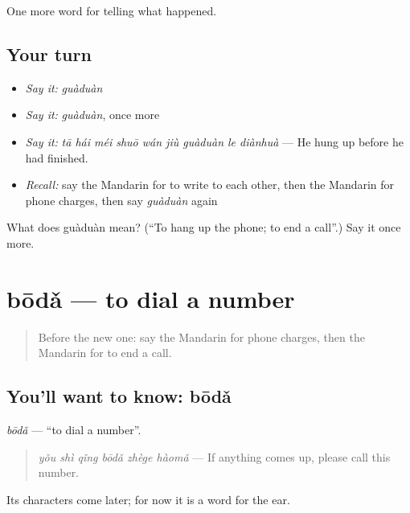 \begin{grammarlens}[title={What you've built}]
One more word for telling what happened.
\end{grammarlens}

\subsection*{Your turn}
\begin{itemize}
\raggedright
  \item \emph{Say it:} \emph{guàduàn}
  \item \emph{Say it:} \emph{guàduàn}, once more
  \item \emph{Say it:} \emph{tā hái méi shuō wán jiù guàduàn le diànhuà} — He hung up before he had finished.
  \item \emph{Recall:} say the Mandarin for to write to each other, then the Mandarin for phone charges, then say \emph{guàduàn} again
\end{itemize}

\begin{tcolorbox}[breakable,colback=teal!4,colframe=teal!35!black,title={Before you move on}]
What does guàduàn mean? (\textquotedblleft{}To hang up the phone; to end a call\textquotedblright{}.) Say it once more.
\end{tcolorbox}
\section[bōdǎ]{bōdǎ — to dial a number}

\label{lesson:ZH-C320-boda}



\begin{quote}
Before the new one: say the Mandarin for phone charges, then the Mandarin for to end a call.
\end{quote}

\subsection*{You'll want to know: bōdǎ}
\emph{bōdǎ} — \textquotedblleft{}to dial a number\textquotedblright{}.

\begin{quote}
\emph{yǒu shì qǐng bōdǎ zhège hàomǎ} — If anything comes up, please call this number.
\end{quote}

Its characters come later; for now it is a word for the ear.

